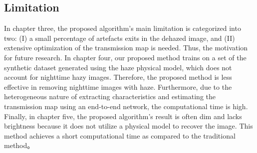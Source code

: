 \documentclass[doctor,english,listoffigures,listoftables]{thesis-uestc}
\begin{document}
\subsection{Limitation}
In chapter three, the proposed algorithm’s main limitation is categorized into two: (I) a small percentage of artefacts exits in the dehazed image, and (II) extensive optimization of the transmission map is needed. Thus, the motivation for future research. In chapter four, our proposed method trains on a set of the synthetic dataset generated using the haze physical model, which does not account for nighttime hazy images. Therefore, the proposed method is less effective in removing nighttime images with haze. Furthermore, due to the heterogeneous nature of extracting characteristics and estimating the transmission map using an end-to-end network, the computational time is high. Finally, in chapter five, the proposed algorithm's result is often dim and lacks brightness because it does not utilize a physical model to recover the image. This method achieves a short computational time as compared to the traditional method。 
\end{document}
